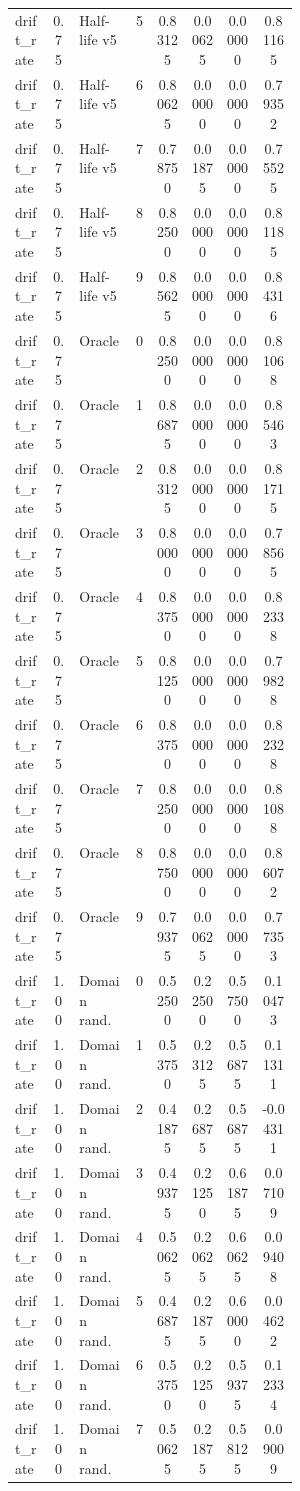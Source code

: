 \documentclass{article}
\begin{document}
\begin{center}
\begin{longtable}{p{0.13\linewidth}cp{0.20\linewidth}ccccc}
drift\_rate & 0.75 & Half-life v5 & 5 & 0.83125 & 0.00625 & 0.00000 & 0.81165\\
drift\_rate & 0.75 & Half-life v5 & 6 & 0.80625 & 0.00000 & 0.00000 & 0.79352\\
drift\_rate & 0.75 & Half-life v5 & 7 & 0.78750 & 0.01875 & 0.00000 & 0.75525\\
drift\_rate & 0.75 & Half-life v5 & 8 & 0.82500 & 0.00000 & 0.00000 & 0.81185\\
drift\_rate & 0.75 & Half-life v5 & 9 & 0.85625 & 0.00000 & 0.00000 & 0.84316\\
drift\_rate & 0.75 & Oracle & 0 & 0.82500 & 0.00000 & 0.00000 & 0.81068\\
drift\_rate & 0.75 & Oracle & 1 & 0.86875 & 0.00000 & 0.00000 & 0.85463\\
drift\_rate & 0.75 & Oracle & 2 & 0.83125 & 0.00000 & 0.00000 & 0.81715\\
drift\_rate & 0.75 & Oracle & 3 & 0.80000 & 0.00000 & 0.00000 & 0.78565\\
drift\_rate & 0.75 & Oracle & 4 & 0.83750 & 0.00000 & 0.00000 & 0.82338\\
drift\_rate & 0.75 & Oracle & 5 & 0.81250 & 0.00000 & 0.00000 & 0.79828\\
drift\_rate & 0.75 & Oracle & 6 & 0.83750 & 0.00000 & 0.00000 & 0.82328\\
drift\_rate & 0.75 & Oracle & 7 & 0.82500 & 0.00000 & 0.00000 & 0.81088\\
drift\_rate & 0.75 & Oracle & 8 & 0.87500 & 0.00000 & 0.00000 & 0.86072\\
drift\_rate & 0.75 & Oracle & 9 & 0.79375 & 0.00625 & 0.00000 & 0.77353\\
drift\_rate & 1.00 & Domain rand. & 0 & 0.52500 & 0.22500 & 0.57500 & 0.10473\\
drift\_rate & 1.00 & Domain rand. & 1 & 0.53750 & 0.23125 & 0.56875 & 0.11311\\
drift\_rate & 1.00 & Domain rand. & 2 & 0.41875 & 0.26875 & 0.56875 & -0.04311\\
drift\_rate & 1.00 & Domain rand. & 3 & 0.49375 & 0.21250 & 0.61875 & 0.07109\\
drift\_rate & 1.00 & Domain rand. & 4 & 0.50625 & 0.20625 & 0.60625 & 0.09408\\
drift\_rate & 1.00 & Domain rand. & 5 & 0.46875 & 0.21875 & 0.60000 & 0.04622\\
drift\_rate & 1.00 & Domain rand. & 6 & 0.53750 & 0.21250 & 0.59375 & 0.12334\\
drift\_rate & 1.00 & Domain rand. & 7 & 0.50625 & 0.21875 & 0.58125 & 0.09009\\

\end{longtable}
\end{center}
\end{document}
